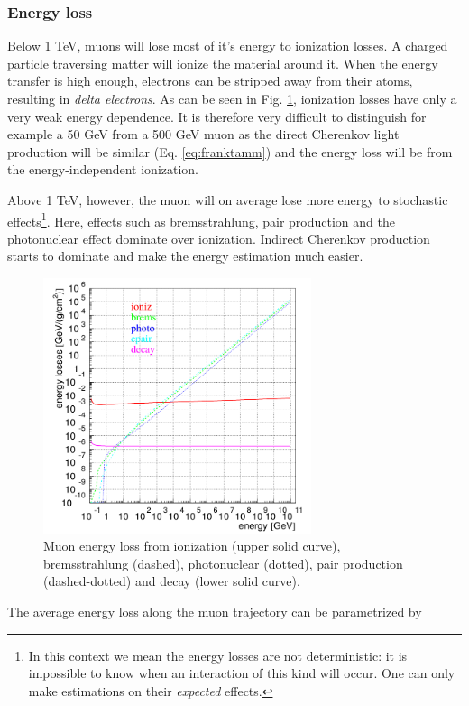\subsubsection{Energy loss}
Below 1 TeV, muons will lose most of it's energy to ionization losses. A charged particle traversing matter will ionize the material around it. When the energy transfer is high enough, electrons can be stripped away from their atoms, resulting in \textit{delta electrons}. As can be seen in Fig. \ref{fig:energyloss}, ionization losses have only a very weak energy dependence. It is therefore very difficult to distinguish for example a 50 GeV from a 500 GeV muon as the direct Cherenkov light production will be similar (Eq. \ref{eq:franktamm}) and the energy loss will be from the energy-independent ionization.

Above 1 TeV, however, the muon will on average lose more energy to stochastic effects\footnote{In this context we mean the energy losses are not deterministic: it is impossible to know when an interaction of this kind will occur. One can only make estimations on their \textit{expected} effects.}. Here, effects such as bremsstrahlung, pair production and the photonuclear effect dominate over ionization. Indirect Cherenkov production starts to dominate and make the energy estimation much easier.\\
\newline
\begin{figure}[ht]
\label{fig:energyloss}
\centering
\includegraphics[width = 0.7\textwidth]{chapter4/img/muonenergyloss.png}
\caption{Muon energy loss from ionization (upper solid curve), bremsstrahlung (dashed), photonuclear (dotted), pair production (dashed-dotted) and decay (lower solid curve).}
\end{figure}
The average energy loss along the muon trajectory can be parametrized by 

